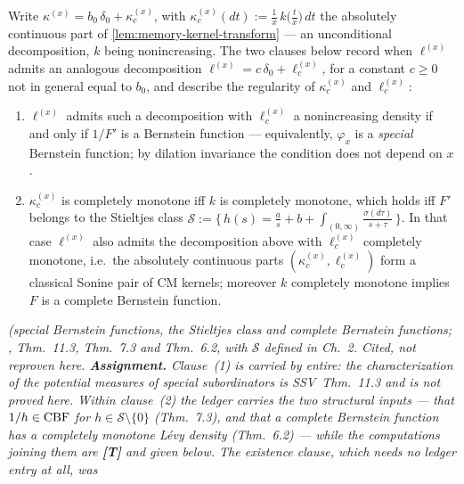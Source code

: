 \begin{proposition}\label{prop:pair-regularity}
\leanok
Write $\kappa^{(x)} = b_0\,\delta_0 + \kappa_c^{(x)}$, with
$\kappa_c^{(x)}(dt) := \tfrac1x\,k\bigl(\tfrac tx\bigr)\,dt$ the absolutely continuous part of
\ref{lem:memory-kernel-transform} --- an unconditional decomposition, $k$ being nonincreasing.
The two clauses below record when $\ell^{(x)}$ admits an analogous decomposition
$\ell^{(x)} = c\,\delta_0 + \ell_c^{(x)}$, for a constant $c \ge 0$ not in general equal to
$b_0$, and describe the regularity of $\kappa_c^{(x)}$ and $\ell_c^{(x)}$:
\begin{enumerate}
\item $\ell^{(x)}$ admits such a decomposition with $\ell_c^{(x)}$ a nonincreasing density if
and only if $1/F'$ is a Bernstein function --- equivalently, $\varphi_x$ is a \emph{special}
Bernstein function; by dilation invariance the condition does not depend on $x$.
\item $\kappa_c^{(x)}$ is completely monotone iff $k$ is completely monotone, which holds iff
$F'$ belongs to the Stieltjes class
$\mathcal{S} := \bigl\{\,h(s) = \tfrac{a}{s} + b + \int_{(0,\infty)} \tfrac{\sigma(d\tau)}{s + \tau}\,\bigr\}$.
In that case $\ell^{(x)}$ also admits the decomposition above with $\ell_c^{(x)}$ completely
monotone, i.e.\ the absolutely continuous parts $(\kappa_c^{(x)}, \ell_c^{(x)})$ form a
classical Sonine pair of CM kernels; moreover $k$ completely monotone implies $F$ is a complete
Bernstein function.
\end{enumerate}
\statusA\quad{}\quad\emph{(special Bernstein functions, the Stieltjes class and
complete Bernstein functions; , Thm.~11.3, Thm.~7.3 and
Thm.~6.2, with $\mathcal{S}$ defined in Ch.~2. Cited, not reproven here.
\textbf{Assignment.} Clause~(1) is carried by  \emph{entire}: the characterization of
the potential measures of special subordinators is SSV~Thm.~11.3 and is not proved here. Within
clause~(2) the ledger carries the two structural inputs --- that $1/h \in \mathrm{CBF}$ for
$h \in \mathcal{S}\setminus\{0\}$ (Thm.~7.3), and that a complete Bernstein function has a
completely monotone Lévy density (Thm.~6.2) --- while the computations joining them are
\textbf{[T]} and given below. The existence clause, which needs no ledger entry at all, was
}
\end{proposition}
